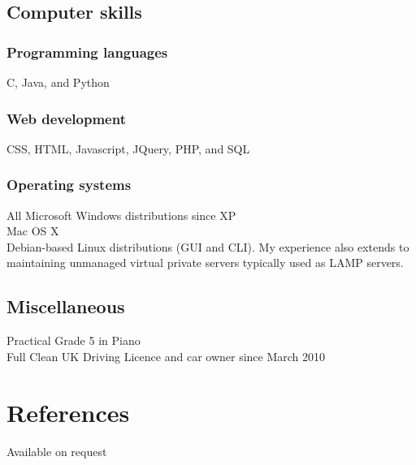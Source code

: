 \documentclass[10pt,a4paper]{article}
\begin{document}
\subsection*{Computer skills}
\subsubsection*{Programming languages}
C, Java, and Python
\subsubsection*{Web development}
CSS, HTML, Javascript, JQuery, PHP, and SQL
\subsubsection*{Operating systems}
All Microsoft Windows distributions since XP\\
Mac OS X\\
Debian-based Linux distributions (GUI and CLI). My experience also extends to maintaining unmanaged virtual private servers typically used as LAMP servers.
\subsection*{Miscellaneous}
Practical Grade 5 in Piano\\
Full Clean UK Driving Licence and car owner since March 2010
\section*{References}
Available on request
\end{document}
